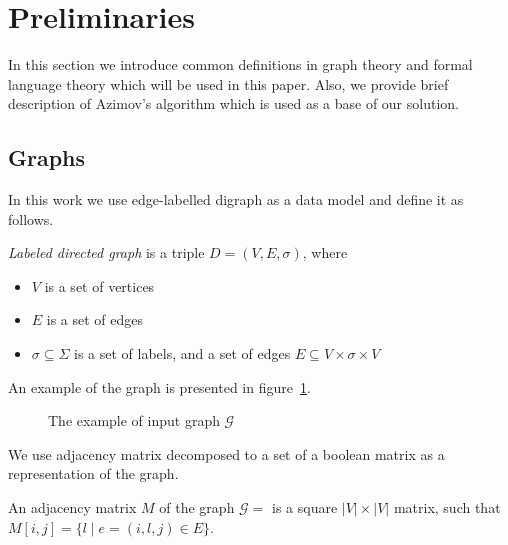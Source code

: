 \section{Preliminaries}

In this section we introduce common definitions in graph theory and formal language theory which will be used in this paper. 
Also, we provide brief description of Azimov's algorithm which is used as a base of our solution.

\subsection{Graphs}

In this work we use edge-labelled digraph as a data model and define it as follows.
\begin{definition} \emph{Labeled directed graph} is a triple $D = (V,E,\sigma)$, where
\begin{itemize}
    \item $V$ is a set of vertices
    \item $E$ is a set of edges
    \item $\sigma \subseteq \Sigma$ is a set of labels, and a set of edges $E\subseteq V\times \sigma \times V$
\end{itemize}
\end{definition}

An example of the graph is presented in figure~\ref{fig:example_input_graph}.

\begin{figure}[h]
    \centering        
    \caption{The example of input graph $\mathcal{G}$}
    \label{fig:example_input_graph}
\end{figure}

We use adjacency matrix decomposed to a set of a boolean matrix as a representation of the graph.
\begin{definition}
An adjacency matrix $M$ of the graph $\mathcal{G}=$ is a square $|V|\times|V|$ matrix, such that $M[i,j] = \{l \mid e = (i,l,j) \in E\}$.
\end{definition}


